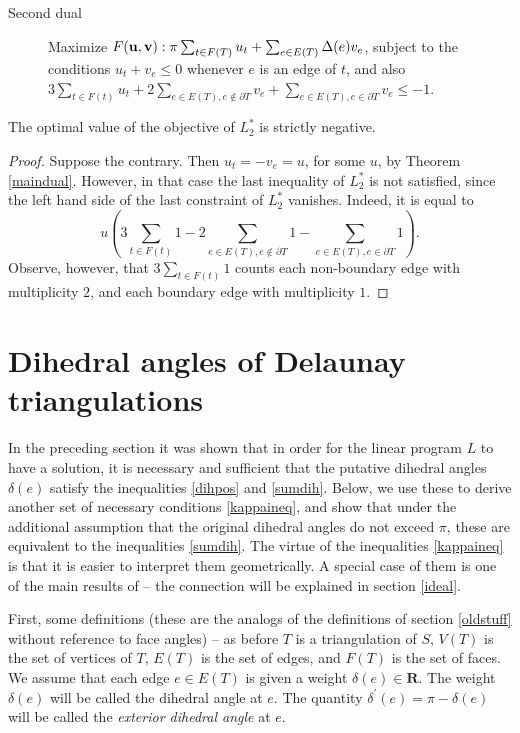 \documentclass{acmart}
\newcommand{\thm}[2]{\begin{#1} #2 \end{#1}}
\begin{document}
\begin{description}
\item[Second dual]
Maximize $F({\bf u}, {\bf v}):\pi \sum_{t \in F(T)} u_t + \sum_{e\in E(T)} \Delta(e)v_e$,
subject to the conditions
$u_t+v_e\leq 0$ whenever $e$ is an edge of $t$, and also
$3  \sum_{t \in F(t)} u_t + 
2 \sum_{e\in E(T), e\notin \partial T} v_e + 
\sum_{e\in E(T), e \in \partial T} v_e \leq -1$.
\end{description}

\thm{theorem}
{
\label{modified}
The optimal value of the objective of $L_2^*$ is strictly negative.
}

\thm{proof}
{
Suppose the contrary. Then $u_t = -v_e = u$, for some $u$,
by Theorem \ref{maindual}. However, in that case the last inequality
of $L_2^*$ is not satisfied, since the left hand side of the last
constraint of $L_2^*$ vanishes. Indeed, it is equal to
$$
u \left(3  \sum_{t \in F(t)} 1 - 2 \sum_{e\in E(T), e\notin \partial
    T} 1 - \sum_{e\in E(T), e \in \partial T} 1 \right).
$$
Observe, however, that $3 \sum_{t \in F(t)} 1$ counts each
non-boundary edge with multiplicity $2$, and each boundary edge with
multiplicity $1.$
}

\section{Dihedral angles of Delaunay triangulations}
\label{dihsec}

In the preceding section it was shown that in order for the linear program
$L$ to have a solution, it is necessary and sufficient that the putative
dihedral angles $\delta(e)$ satisfy the inequalities \ref{dihpos} and
\ref{sumdih}. Below, we use these to derive another set of necessary conditions
\ref{kappaineq}, and show that under the additional assumption that
the original dihedral angles do not exceed $\pi$, these are equivalent
to the inequalities \ref{sumdih}. The virtue of the inequalities \ref{kappaineq}
is that it is easier to interpret them geometrically. A special case of them
is one of the main results of \cite{steiner} -- the connection will be explained
in section  \ref{ideal}.

First, some definitions (these are the analogs of the definitions of section
\ref{oldstuff} without reference to face angles) -- as before $T$ is a
triangulation of $S$, $V(T)$ is the set of vertices of $T$, $E(T)$ is
the set of edges, and $F(T)$ is the set of faces. We assume that each
edge $e\in E(T)$ is given a weight $\delta(e)\in \mathbf{R}$.  
The weight $\delta(e)$ will be called the dihedral angle at $e$. 
The quantity $\delta^\prime(e)=\pi - \delta(e)$ will be called the
\emph{exterior dihedral angle} at $e$. 
\end{document}
